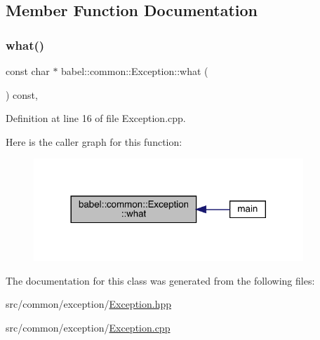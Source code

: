 \subsection{Member Function Documentation}
\mbox{\label{classbabel_1_1common_1_1_exception_ab18e71922173ed032bd7c59ebe7ac299}} 
\subsubsection{\texorpdfstring{what()}{what()}}
{\footnotesize\ttfamily const char $\ast$ babel\+::common\+::\+Exception\+::what (\begin{DoxyParamCaption}{ }\end{DoxyParamCaption}) const\hspace{0.3cm}{\ttfamily [override]}, {\ttfamily [noexcept]}}



Definition at line 16 of file Exception.\+cpp.

Here is the caller graph for this function\+:\nopagebreak
\begin{figure}[H]
\begin{center}
\leavevmode
\includegraphics[width=288pt]{classbabel_1_1common_1_1_exception_ab18e71922173ed032bd7c59ebe7ac299_icgraph}
\end{center}
\end{figure}


The documentation for this class was generated from the following files\+:\begin{DoxyCompactItemize}
\item 
src/common/exception/\mbox{\hyperlink{_exception_8hpp}{Exception.\+hpp}}\item 
src/common/exception/\mbox{\hyperlink{_exception_8cpp}{Exception.\+cpp}}\end{DoxyCompactItemize}
